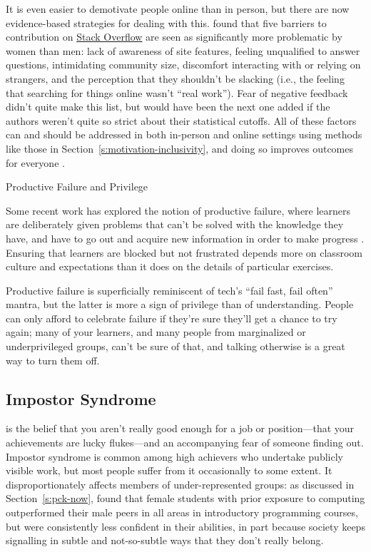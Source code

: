 It is even easier to demotivate people online than in person, but
there are now evidence-based strategies for dealing with this.
\cite{Ford2016} found that five barriers to contribution on \href{https://stackoverflow.com/}{Stack
Overflow} are seen as significantly more problematic
by women than men: lack of awareness of site features, feeling
unqualified to answer questions, intimidating community size,
discomfort interacting with or relying on strangers, and the
perception that they shouldn't be slacking (i.e., the feeling that
searching for things online wasn't ``real work''). Fear of negative
feedback didn't quite make this list, but would have been the next one
added if the authors weren't quite so strict about their statistical
cutoffs. All of these factors can and should be addressed in both
in-person and online settings using methods like those in
Section~\ref{s:motivation-inclusivity}, and doing so improves outcomes
for everyone \cite{Sved2016}.

\begin{aside}{Productive Failure and Privilege}

Some recent work has explored the notion of productive failure, where
learners are deliberately given problems that can't be solved with the
knowledge they have, and have to go out and acquire new information in
order to make progress \cite{Kapu2016}. Ensuring that learners are
blocked but not frustrated depends more on classroom culture and
expectations than it does on the details of particular exercises.

Productive failure is superficially reminiscent of tech's ``fail fast,
fail often'' mantra, but the latter is more a sign of privilege than of
understanding. People can only afford to celebrate failure if they're
sure they'll get a chance to try again; many of your learners, and
many people from marginalized or underprivileged groups, can't be sure
of that, and talking otherwise is a great way to turn them off.

\end{aside}

\subsection{Impostor Syndrome}\label{s:motivation-impostor-syndrome}

 is the belief that
you aren't really good enough for a job or position---that your
achievements are lucky flukes---and an accompanying fear of someone
finding out. Impostor syndrome is common among high achievers who
undertake publicly visible work, but most people suffer from it
occasionally to some extent. It disproportionately affects members of
under-represented groups: as discussed in Section~\ref{s:pck-now},
\cite{Wilc2018} found that female students with prior exposure to
computing outperformed their male peers in all areas in introductory
programming courses, but were consistently less confident in their
abilities, in part because society keeps signalling in subtle and
not-so-subtle ways that they don't really belong.

